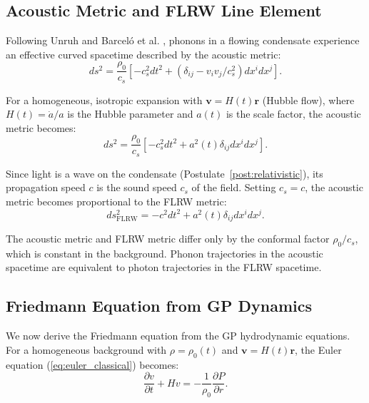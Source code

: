 \documentclass[11pt,a4paper]{article}
\theoremstyle{definition}
\theoremstyle{remark}
\begin{document}
\subsection{Acoustic Metric and FLRW Line Element}
\label{sec:acoustic_flrw}

Following Unruh \cite{Unruh1981} and Barceló et al. \cite{Barcelo2005}, phonons in a flowing condensate experience an effective curved spacetime described by the acoustic metric:
\begin{equation}
\label{eq:acoustic_metric_general}
ds^2 = \frac{\rho_0}{c_s}\left[-c_s^2 dt^2 + (\delta_{ij} - v_i v_j/c_s^2)dx^i dx^j\right].
\end{equation}

For a homogeneous, isotropic expansion with $\mathbf{v} = H(t)\mathbf{r}$ (Hubble flow), where $H(t) = \dot{a}/a$ is the Hubble parameter and $a(t)$ is the scale factor, the acoustic metric becomes:
\begin{equation}
\label{eq:acoustic_metric_hubble}
ds^2 = \frac{\rho_0}{c_s}\left[-c_s^2 dt^2 + a^2(t)\delta_{ij}dx^i dx^j\right].
\end{equation}

Since light is a wave on the condensate (Postulate~\ref{post:relativistic}), its propagation speed $c$ is the sound speed $c_s$ of the field. Setting $c_s = c$, the acoustic metric becomes proportional to the FLRW metric:
\begin{equation}
\label{eq:flrw_metric}
ds^2_{\mathrm{FLRW}} = -c^2 dt^2 + a^2(t)\delta_{ij}dx^i dx^j.
\end{equation}

The acoustic metric and FLRW metric differ only by the conformal factor $\rho_0/c_s$, which is constant in the background. Phonon trajectories in the acoustic spacetime are equivalent to photon trajectories in the FLRW spacetime.

\subsection{Friedmann Equation from GP Dynamics}
\label{sec:friedmann_derivation}

We now derive the Friedmann equation from the GP hydrodynamic equations. For a homogeneous background with $\rho = \rho_0(t)$ and $\mathbf{v} = H(t)\mathbf{r}$, the Euler equation (\ref{eq:euler_classical}) becomes:
\begin{equation}
\label{eq:euler_homogeneous}
\frac{\partial v}{\partial t} + H v = -\frac{1}{\rho_0}\frac{\partial P}{\partial r}.
\end{equation}
\end{document}

